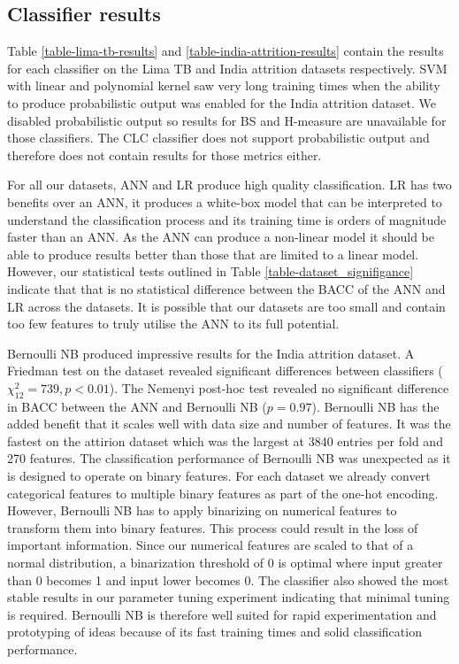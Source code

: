 \documentclass{sig-alternate-05-2015}
\begin{document}
	\subsection{Classifier results}
	\label{classifier-results}
	Table \ref{table-lima-tb-results} and \ref{table-india-attrition-results} contain the results for each classifier on the Lima TB and India attrition datasets respectively. SVM with linear and polynomial kernel saw very long training times when the ability to produce probabilistic output was enabled for the India attrition dataset. We disabled probabilistic output so results for BS and H-measure are unavailable for those classifiers. The CLC classifier does not support probabilistic output and therefore does not contain results for those metrics either.
	
	For all our datasets, ANN and LR produce high quality classification. LR has two benefits over an ANN, it produces a white-box model that can be interpreted to understand the classification process \cite{Dreiseitl2002352} and its training time is orders of magnitude faster than an ANN. As the ANN can produce a non-linear model it should be able to produce results better than those that are limited to a linear model. However, our statistical tests outlined in Table \ref{table-dataset_signifigance} indicate that that is no statistical difference between the BACC of the ANN and LR across the datasets. It is possible that our datasets are too small and contain too few features to truly utilise the ANN to its full potential. 
	
	Bernoulli NB produced impressive results for the India attrition dataset. A Friedman test on the dataset revealed significant differences between classifiers ($\chi^2_{12}=739, p<0.01$). The Nemenyi post-hoc test revealed no significant difference in BACC between the ANN and Bernoulli NB ($p=0.97$). Bernoulli NB has the added benefit that it scales well with data size and number of features. It was the fastest on the attirion dataset which was the largest at 3840 entries per fold and 270 features. The classification performance of Bernoulli NB was unexpected as it is designed to operate on binary features. For each dataset we already convert categorical features to multiple binary features as part of the one-hot encoding. However, Bernoulli NB has to apply binarizing on numerical features to transform them into binary features. This process could result in the loss of important information. Since our numerical features are scaled to that of a normal distribution, a binarization threshold of 0 is optimal where input greater than 0 becomes 1 and input lower becomes 0. The classifier also showed the most stable results in our parameter tuning experiment indicating that minimal tuning is required. Bernoulli NB is therefore well suited for rapid experimentation and prototyping of ideas because of its fast training times and solid classification performance.
\end{document}
